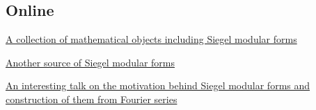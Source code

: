 \documentclass[11pt, oneside]{amsart}
\begin{document}
\subsection{Online}
\begin{list}{}{}
\item \href{lmfdb.org}{A collection of mathematical objects including Siegel modular forms}
\item \href{http://siegelmodularforms.org/}{Another source of Siegel modular forms}
\item \href{https://icerm.brown.edu/materials/Slides/sp-f15-w1/Tables_of_paramodular_eigenforms_]_Cris_Poor,_Fordham_University.pdf}{An interesting talk on the motivation behind Siegel modular forms and construction of them from Fourier series}

\end{list}
\end{document}
